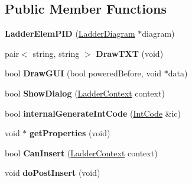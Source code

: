 \subsection*{Public Member Functions}
\begin{DoxyCompactItemize}
\item 
\hypertarget{class_ladder_elem_p_i_d_ab0627f755af374ed7790e3a462841ae2}{{\bfseries Ladder\-Elem\-P\-I\-D} (\hyperlink{class_ladder_diagram}{Ladder\-Diagram} $\ast$diagram)}\label{class_ladder_elem_p_i_d_ab0627f755af374ed7790e3a462841ae2}

\item 
\hypertarget{class_ladder_elem_p_i_d_a1c29d13b8bbe0c238bd05c2b73d9b115}{pair$<$ string, string $>$ {\bfseries Draw\-T\-X\-T} (void)}\label{class_ladder_elem_p_i_d_a1c29d13b8bbe0c238bd05c2b73d9b115}

\item 
\hypertarget{class_ladder_elem_p_i_d_acff9faa46649e9da7125bbcaa0a20b5b}{bool {\bfseries Draw\-G\-U\-I} (bool powered\-Before, void $\ast$data)}\label{class_ladder_elem_p_i_d_acff9faa46649e9da7125bbcaa0a20b5b}

\item 
\hypertarget{class_ladder_elem_p_i_d_aa916b68a41de267712e585b3322bf138}{bool {\bfseries Show\-Dialog} (\hyperlink{struct_ladder_context}{Ladder\-Context} context)}\label{class_ladder_elem_p_i_d_aa916b68a41de267712e585b3322bf138}

\item 
\hypertarget{class_ladder_elem_p_i_d_a1900417813a2ac6d933a0b52fb6db2ff}{bool {\bfseries internal\-Generate\-Int\-Code} (\hyperlink{class_int_code}{Int\-Code} \&ic)}\label{class_ladder_elem_p_i_d_a1900417813a2ac6d933a0b52fb6db2ff}

\item 
\hypertarget{class_ladder_elem_p_i_d_a7788f713b61b0d0abc954faa23ae8d0c}{void $\ast$ {\bfseries get\-Properties} (void)}\label{class_ladder_elem_p_i_d_a7788f713b61b0d0abc954faa23ae8d0c}

\item 
\hypertarget{class_ladder_elem_p_i_d_a4e38abba01987edfddba35a4da192ff9}{bool {\bfseries Can\-Insert} (\hyperlink{struct_ladder_context}{Ladder\-Context} context)}\label{class_ladder_elem_p_i_d_a4e38abba01987edfddba35a4da192ff9}

\item 
\hypertarget{class_ladder_elem_p_i_d_a260608ceb315058522655c457362dbda}{void {\bfseries do\-Post\-Insert} (void)}\label{class_ladder_elem_p_i_d_a260608ceb315058522655c457362dbda}


\end{DoxyCompactItemize}
